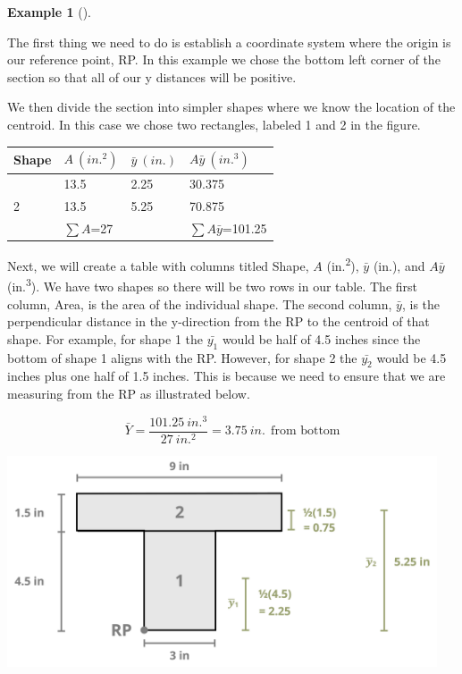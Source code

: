 \documentclass[
  letterpaper,
  DIV=11,
  numbers=noendperiod]{scrreprt}
\theoremstyle{definition}
\newtheorem{example}{Example}[chapter]
\theoremstyle{remark}
\begin{document}
\begin{tcolorbox}
\begin{example}[]
\begin{tcolorbox}
The first thing we need to do is establish a coordinate system where the
origin is our reference point, RP. In this example we chose the bottom
left corner of the section so that all of our y distances will be
positive.

We then divide the section into simpler shapes where we know the
location of the centroid. In this case we chose two rectangles, labeled
1 and 2 in the figure.

\begin{longtable}[]{@{}llll@{}}
\toprule\noalign{}
Shape & \(A{~(in.^2)}\) & \(\bar{y}{~(in.)}\) &
\(A\bar{y}{~(in.^3)}\) \\
\midrule\noalign{}
\endhead
\bottomrule\noalign{}
\endlastfoot
1 & 13.5 & 2.25 & 30.375 \\
2 & 13.5 & 5.25 & 70.875 \\
& \(\sum A\)=27 & & \(\sum A\bar{y}\)=101.25 \\
\end{longtable}

Next, we will create a table with columns titled Shape, \(A\)
(in.\textsuperscript{2}), \(\bar{y}\) (in.), and \(A\bar{y}\)
(in.\textsuperscript{3}). We have two shapes so there will be two rows
in our table. The first column, Area, is the area of the individual
shape. The second column, \(\bar{y}\), is the perpendicular distance in
the y-direction from the RP to the centroid of that shape. For example,
for shape 1 the \(\bar{y_1}\) would be half of 4.5 inches since the
bottom of shape 1 aligns with the RP. However, for shape 2 the
\(\bar{y_2}\) would be 4.5 inches plus one half of 1.5 inches. This is
because we need to ensure that we are measuring from the RP as
illustrated below.

\[
\bar{Y}=\frac{101.25{~in.^3}}{27{~in.^2}}=3.75{~in.} ~~\text{from bottom}
\]

\begin{center}
\includegraphics[width=5.01042in,height=\textheight]{images/CH 8 PNGs/example 8.1 part 3.png}
\end{center}


\end{tcolorbox}
\end{example}
\end{tcolorbox}
\end{document}
